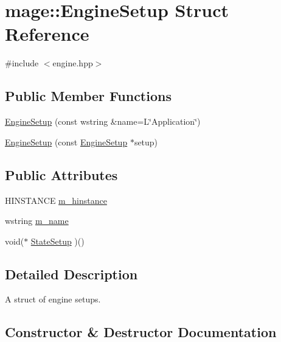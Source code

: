 \hypertarget{structmage_1_1_engine_setup}{}\section{mage\+:\+:Engine\+Setup Struct Reference}
\label{structmage_1_1_engine_setup}


{\ttfamily \#include $<$engine.\+hpp$>$}

\subsection*{Public Member Functions}
\begin{DoxyCompactItemize}
\item 
\hyperlink{structmage_1_1_engine_setup_a75ee36366d3035c9600e1dbe98973aa4}{Engine\+Setup} (const wstring \&name=L\char`\"{}Application\char`\"{})
\item 
\hyperlink{structmage_1_1_engine_setup_a767bc519dffa2d4cdba61529d12831d8}{Engine\+Setup} (const \hyperlink{structmage_1_1_engine_setup}{Engine\+Setup} $\ast$setup)
\end{DoxyCompactItemize}
\subsection*{Public Attributes}
\begin{DoxyCompactItemize}
\item 
H\+I\+N\+S\+T\+A\+N\+CE \hyperlink{structmage_1_1_engine_setup_af91461305cd9aa60e22fa770395d2238}{m\+\_\+hinstance}
\item 
wstring \hyperlink{structmage_1_1_engine_setup_a3866920e44c0752a89265f9f0c5c5d05}{m\+\_\+name}
\item 
void($\ast$ \hyperlink{structmage_1_1_engine_setup_a36a3c8a316c63e6c90ee9dd6efb82c0c}{State\+Setup} )()
\end{DoxyCompactItemize}


\subsection{Detailed Description}
A struct of engine setups. 

\subsection{Constructor \& Destructor Documentation}
\hypertarget{structmage_1_1_engine_setup_a75ee36366d3035c9600e1dbe98973aa4}{}\label{structmage_1_1_engine_setup_a75ee36366d3035c9600e1dbe98973aa4} 
